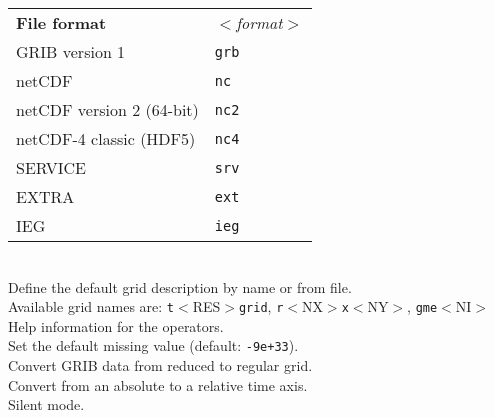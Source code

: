 \begin{tabbing}
         \> \parbox[r]{3in}{
              \vspace*{1mm}
              \hspace*{0cm}\begin{tabular}{|l|l|}
              \hline
              \rowcolor[gray]{.9}
              {\bf File format}          & \sl $<$format$>$ \\
               GRIB version 1            & {\tt grb} \\
               netCDF                    & {\tt nc}  \\
               netCDF version 2 (64-bit) & {\tt nc2} \\
               netCDF-4 classic (HDF5)   & {\tt nc4} \\
               SERVICE                   & {\tt srv} \\
               EXTRA                     & {\tt ext} \\
               IEG                       & {\tt ieg} \\
              \hline
              \end{tabular}
              \vspace*{1mm}
            } \\
         \> Define the default grid description by name or from file. \\
         \> Available grid names are: {\tt t}$<$RES$>${\tt grid}, {\tt r}$<$NX$>${\tt x}$<$NY$>$, {\tt gme}$<$NI$>$ \\
         \> Help information for the operators. \\
         \> Set the default missing value (default: {\tt-9e+33}). \\
         \> Convert GRIB data from reduced to regular grid. \\
         \> Convert from an absolute to a relative time axis. \\
         \> Silent mode. \\

\end{tabbing}
